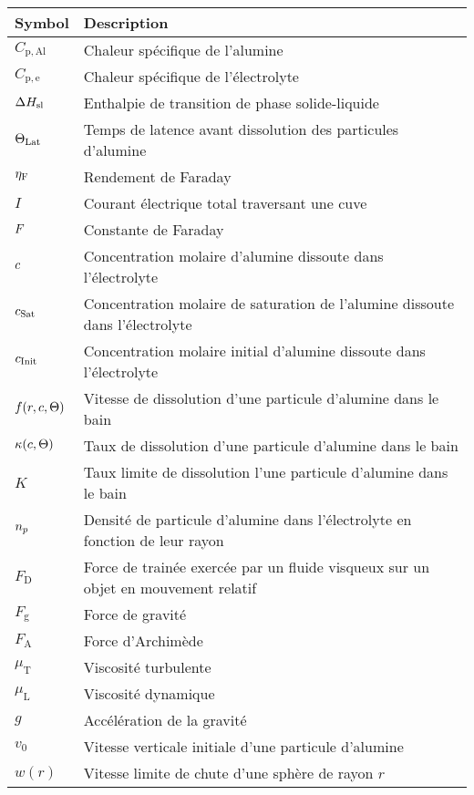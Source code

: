 \begin{tabularx}{\textwidth}{@{}ll@{}}
  \toprule
  Symbol & Description \\
  \midrule
  $C_\mathrm{p,Al}$ & Chaleur spécifique de l'alumine\\
  $C_\mathrm{p,e}$ & Chaleur spécifique de l'électrolyte\\
  $\Delta H_\mathrm{sl}$ & Enthalpie de transition de phase solide-liquide\\
  $\Theta_\text{Lat}$ & Temps de latence avant dissolution des particules d'alumine\\
  $\eta_\mathrm{F}$ & Rendement de Faraday\\
  $I$ & Courant électrique total traversant une cuve\\
  $F$ & Constante de Faraday\\
  $c$ & Concentration molaire d'alumine dissoute dans l'électrolyte\\
  $c_\text{Sat}$ & Concentration molaire de saturation de l'alumine dissoute dans l'électrolyte\\
  $c_\text{Init}$ & Concentration molaire initial d'alumine dissoute dans l'électrolyte\\
  $f(r, c,\Theta)$ & Vitesse de dissolution d'une particule d'alumine dans le bain\\
  $\kappa(c, \Theta)$ & Taux de dissolution d'une particule d'alumine dans le bain\\
  $K$ & Taux limite de dissolution l'une particule d'alumine dans le bain \\
  $n_p$ & Densité de particule d'alumine dans l'électrolyte en fonction de leur rayon\\
  $F_\mathrm{D}$ & Force de trainée exercée par un fluide visqueux sur un objet en mouvement relatif\\
  $F_\mathrm{g}$ & Force de gravité\\
  $F_\mathrm{A}$ & Force d'Archimède\\
  $\mu_\mathrm{T}$ & Viscosité turbulente\\
  $\mu_\mathrm{L}$ & Viscosité dynamique\\
  $g$ & Accélération de la gravité \\
  $v_0$ & Vitesse verticale initiale d'une particule d'alumine \\
  $w(r)$ & Vitesse limite de chute d'une sphère de rayon $r$\\

\end{tabularx}
